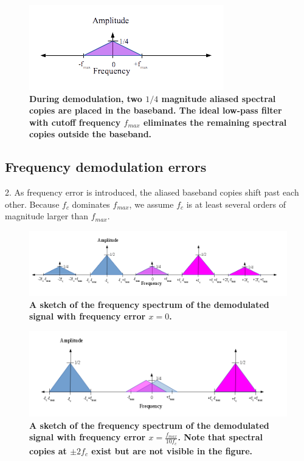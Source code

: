 \documentclass[letterpaper,12pt]{article}
\begin{document}
\begin{figure}[hbtp]
\includegraphics[width=1.0\columnwidth]{prelab1-figure1b}
\caption{
\label{fig:prelab1-figure1b}
{\bf During demodulation, two $1/4$ magnitude aliased spectral copies are
placed in the baseband. The ideal low-pass filter with cutoff frequency
$f_{max}$ eliminates the remaining spectral copies outside the baseband.
}
}
\end{figure}
\pagebreak

\subsection*{Frequency demodulation errors}

2. As frequency error is introduced, the aliased baseband copies shift past each
other.  Because $f_{c}$ dominates $f_{max}$, we assume $f_{c}$ is at least
several orders of magnitude larger than $f_{max}$.

\begin{figure}[hbtp]
\includegraphics[width=1.0\columnwidth]{prelab1-figure2a}
\caption{
\label{fig:prelab1-figure2a}
{\bf A sketch of the frequency spectrum of the demodulated signal with
frequency error $x=0$.
}
}
\end{figure}

\begin{figure}[hbtp]
\includegraphics[width=1.0\columnwidth]{prelab1-figure2b}
\caption{
\label{fig:prelab1-figure2b}
{\bf A sketch of the frequency spectrum of the demodulated signal with
frequency error $x=\frac{f_{max}}{10f_{c}}$. Note that spectral copies at
$\pm2f_{c}$ exist but are not visible in the figure.
}
}
\end{figure}
\end{document}
